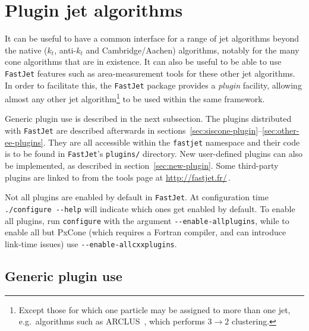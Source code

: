 \documentclass[12pt,a4]{article}
\newcommand{\fastjet}{\texttt{FastJet}\xspace}
\newcommand{\ttt}[1]{{\small\texttt{#1}}}
\begin{document}
\section{Plugin jet algorithms}
\label{sec:plugins}

It can be useful to have a common interface for a range of jet
algorithms beyond the native ($k_t$, anti-$k_t$ and Cambridge/Aachen)
algorithms, notably for the many cone algorithms that are in
existence. 
%
It can also be useful to be able to use \fastjet features such as
area-measurement tools for these other jet algorithms.
%
In order to facilitate this, the
\fastjet package provides a \emph{plugin} facility, allowing almost
any other jet algorithm\footnote{Except those for which one particle
  may be assigned to more than one jet, e.g.\ algorithms such as
  ARCLUS~\cite{Lonnblad:1992qd}, which performs $3\to2$
  clustering.} to be used within the same framework.

Generic plugin use is described in the next subsection.
%
The plugins distributed with \fastjet are described afterwards in
sections~\ref{sec:siscone-plugin}--\ref{sec:other-ee-plugins}.
%
They are all accessible within the \ttt{fastjet} namespace and their code
is to be found in \fastjet's \ttt{plugins/} directory.
%
New user-defined plugins can also be implemented, as described 
in section~\ref{sec:new-plugin}. 
%
Some third-party plugins are linked to from the tools page at
\url{http://fastjet.fr/}$\,$.

Not all plugins are enabled by default in \fastjet. At configuration
time \verb:./configure --help: will indicate which ones get enabled
by default. To enable all plugins, run \verb|configure| with the
argument \verb|--enable-allplugins|, while to enable all but PxCone
(which requires a Fortran compiler, and can introduce link-time issues) use
\verb|--enable-allcxxplugins|.


\subsection{Generic plugin use}
\label{sec:generic-plugin-use}
\end{document}
